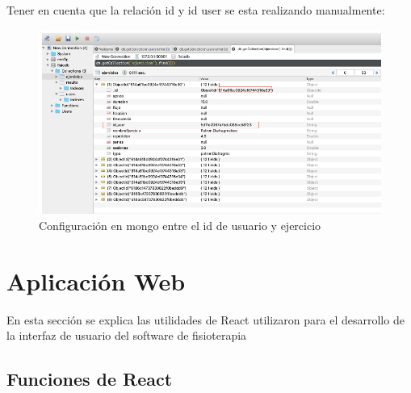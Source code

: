 \documentclass[12pt]{article}
\begin{document}
\begin{enumerate}
            Tener en cuenta que la relación id y id user se esta realizando manualmente:
            \begin{figure}[ht]
            \centering
            \includegraphics[scale=0.4]{imag/realcionmongoonline.png}
            \caption{Configuración en mongo entre el id de usuario y ejercicio }
            \label{6}
            \end{figure}
            \FloatBarrier
            
            
    
    
\end{enumerate}






















\section{Aplicación Web}

En esta sección se explica las utilidades de React utilizaron para el desarrollo de la interfaz de usuario del software de fisioterapia

\subsection{Funciones de React}
\end{document}
